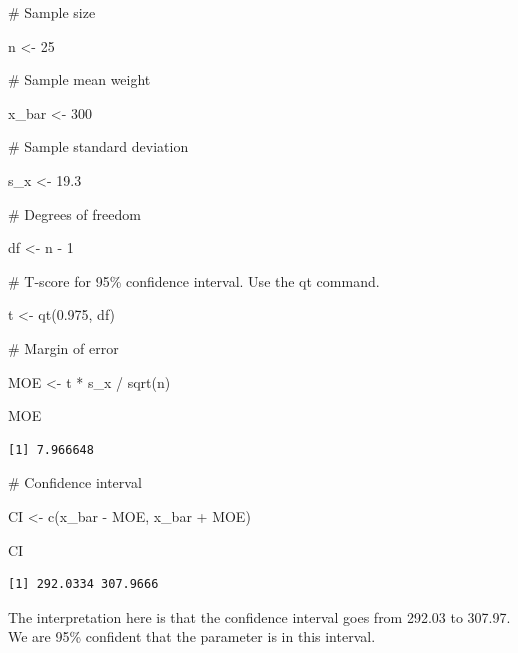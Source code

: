 \documentclass[
  letterpaper,
  DIV=11,
  numbers=noendperiod]{scrreprt}
\newenvironment{Shaded}{\begin{snugshade}}{\end{snugshade}}
\newcommand{\CommentTok}[1]{\textcolor[rgb]{0.37,0.37,0.37}{#1}}
\newcommand{\DecValTok}[1]{\textcolor[rgb]{0.68,0.00,0.00}{#1}}
\newcommand{\FloatTok}[1]{\textcolor[rgb]{0.68,0.00,0.00}{#1}}
\newcommand{\FunctionTok}[1]{\textcolor[rgb]{0.28,0.35,0.67}{#1}}
\newcommand{\NormalTok}[1]{\textcolor[rgb]{0.00,0.23,0.31}{#1}}
\newcommand{\OtherTok}[1]{\textcolor[rgb]{0.00,0.23,0.31}{#1}}
\newcommand{\SpecialCharTok}[1]{\textcolor[rgb]{0.37,0.37,0.37}{#1}}
\begin{document}
\begin{Shaded}
\begin{Highlighting}[]
\CommentTok{\# Sample size}

\NormalTok{n }\OtherTok{\textless{}{-}} \DecValTok{25}

\CommentTok{\# Sample mean weight}

\NormalTok{x\_bar }\OtherTok{\textless{}{-}} \DecValTok{300}

\CommentTok{\# Sample standard deviation}

\NormalTok{s\_x }\OtherTok{\textless{}{-}} \FloatTok{19.3}

\CommentTok{\# Degrees of freedom}

\NormalTok{df }\OtherTok{\textless{}{-}}\NormalTok{ n }\SpecialCharTok{{-}} \DecValTok{1}

\CommentTok{\# T{-}score for 95\% confidence interval. Use the qt command.}

\NormalTok{t }\OtherTok{\textless{}{-}} \FunctionTok{qt}\NormalTok{(}\FloatTok{0.975}\NormalTok{, df)}

\CommentTok{\# Margin of error}

\NormalTok{MOE }\OtherTok{\textless{}{-}}\NormalTok{ t }\SpecialCharTok{*}\NormalTok{ s\_x }\SpecialCharTok{/} \FunctionTok{sqrt}\NormalTok{(n)}

\NormalTok{MOE}
\end{Highlighting}
\end{Shaded}

\begin{verbatim}
[1] 7.966648
\end{verbatim}

\begin{Shaded}
\begin{Highlighting}[]
\CommentTok{\# Confidence interval}

\NormalTok{CI }\OtherTok{\textless{}{-}} \FunctionTok{c}\NormalTok{(x\_bar }\SpecialCharTok{{-}}\NormalTok{ MOE, x\_bar }\SpecialCharTok{+}\NormalTok{ MOE)}

\NormalTok{CI}
\end{Highlighting}
\end{Shaded}

\begin{verbatim}
[1] 292.0334 307.9666
\end{verbatim}

The interpretation here is that the confidence interval goes from 292.03
to 307.97. We are 95\% confident that the parameter is in this interval.
\end{document}
